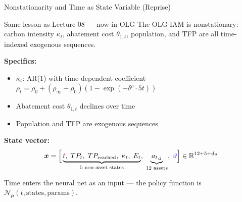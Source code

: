 \documentclass[aspectratio=169,11pt]{beamer}
\newcommand{\emphc}[1]{\textcolor{harvardcrimson}{#1}}
\newcommand{\x}{\bm{x}}
\newcommand{\nn}{\mathcal{N}_{\bm{\rho}}}
\begin{document}
\begin{frame}{Nonstationarity and Time as State Variable (Reprise)}
\begin{alertblock}{Same lesson as Lecture 08 --- now in OLG}
The OLG-IAM is \emphc{nonstationary}: carbon intensity $\kappa_t$, abatement cost $\theta_{1,t}$, population, and TFP are all time-indexed exogenous sequences.
\end{alertblock}

\vspace{0.2cm}
\textbf{Specifics:}
\begin{itemize}
    \item $\kappa_t$: AR(1) with time-dependent coefficient $\rho_t = \rho_0 + (\rho_\infty - \rho_0)(1-\exp(-\delta^\rho \cdot 5t))$
    \item Abatement cost $\theta_{1,t}$ declines over time
    \item Population and TFP are exogenous sequences
\end{itemize}

\vspace{0.2cm}
\textbf{State vector:}
\[
\x = \Big[\underbrace{\emphc{t},\; TP_t,\; TP_{\mathrm{reached}},\; \kappa_t,\; E_t}_{5 \text{ non-asset states}},\; \underbrace{a_{t,j}}_{12 \text{ assets}},\; \textcolor{blue}{\vartheta}\Big] \in \mathbb{R}^{12 + 5 + d_\vartheta}
\]

\vspace{0.1cm}
Time enters the neural net as an input --- the policy function is $\nn(t, \text{states}, \text{params})$.
\end{frame}
\end{document}
